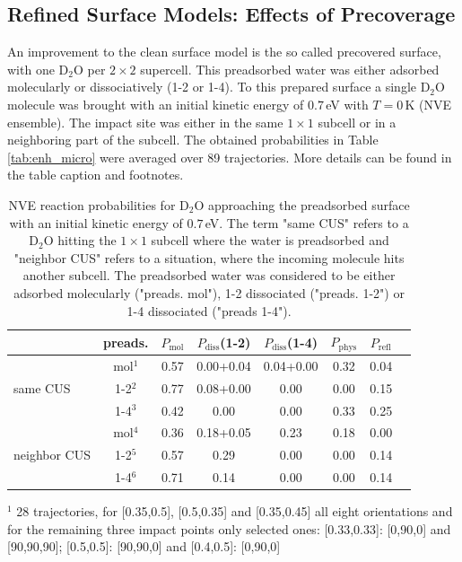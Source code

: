 \documentclass[11pt,DIV=13,BCOR=5mm,a4paper,headinclude]{scrbook}
\begin{document}
\subsection{Refined Surface Models: Effects of Precoverage}
An improvement to the clean surface model is the so called precovered surface, with one D$_2$O per $2\times 2$ supercell.
This preadsorbed water was either adsorbed molecularly or dissociatively (1-2 or 1-4).
To this prepared surface a single D$_2$O molecule was brought with an initial kinetic energy of $0.7\,$eV with $T=0\,$K  (NVE ensemble).
The impact site was either in the same $1\times 1$ subcell or in a neighboring part of the subcell.
The obtained probabilities in Table \ref{tab:enh_micro} were averaged over 89 trajectories.
More details can be found in the table caption and footnotes.
\\
\begin{table}[hbt]
 \centering
  \caption{NVE reaction probabilities for D$_2$O approaching the preadsorbed surface with an initial kinetic energy of $0.7\,$eV.
The term "same CUS" refers to a D$_2$O hitting the $1\times 1$ subcell where the water is preadsorbed and "neighbor CUS" refers to a situation, where the incoming molecule hits another subcell.
The preadsorbed water was considered to be either adsorbed molecularly ("preads. mol"), 1-2 dissociated ("preads. 1-2") or 1-4 dissociated ("preads 1-4").}
 \begin{tabular}{l|c|cccccc}
\toprule
& preads. &$P_\textrm{mol}$ & $P_\textrm{diss}$(1-2) &  $P_\textrm{diss}$(1-4) & $P_\textrm{phys}$ & $P_\textrm{refl}$ \\\midrule
\multirow{3}{*}{same CUS}& mol$^1$ &0.57 &0.00+0.04 &0.04+0.00  &0.32 &0.04 \\
& 1-2$^2$ &0.77 &0.08+0.00 &0.00 &0.00 &0.15 \\
& 1-4$^3$ &0.42 &0.00 &0.00 &0.33 &0.25 \\\hline
\multirow{3}{*}{neighbor CUS}& mol$^4$ &0.36 &0.18+0.05 &0.23 &0.18 & 0.00  \\
& 1-2$^5$ &0.57 &0.29 & 0.00  &0.00 &0.14 \\
& 1-4$^6$ &0.71 &0.14 &0.00 & 0.00 & 0.14 \\\bottomrule
\end{tabular}
\begin{tablenotes}
 \footnotesize
\item[] $^1$ 28 trajectories, for [0.35,0.5], [0.5,0.35] and [0.35,0.45] all eight orientations and for the remaining three impact points only selected ones: [0.33,0.33]: [0,90,0] and [90,90,90]; [0.5,0.5]: [90,90,0] and [0.4,0.5]: [0,90,0]

\end{tablenotes}
\end{table}
\end{document}
